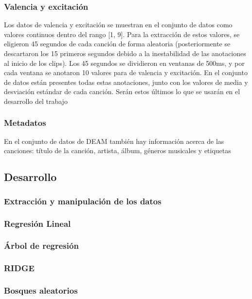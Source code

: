 \documentclass[12pt,a4paper,Spanish]{article}
\begin{document}
\subsubsection{Valencia y excitación}
Los datos de valencia y excitación se muestran en el conjunto de datos como valores continuos dentro del rango [1, 9].
\newline
Para la extracción de estos valores, se eligieron 45 segundos de cada canción de forma aleatoria (posteriormente se descartaron los 15 primeros segundos debido a la inestabilidad de las anotaciones al inicio de los clips). Los 45 segundos se dividieron en ventanas de 500ms, y por cada ventana se anotaron 10 valores para de valencia y excitación.
\newline
En el conjunto de datos están presentes todas estas anotaciones, junto con los valores de media y desviación estándar de cada canción. Serán estos últimos lo que se usarán en el desarrollo del trabajo

\subsubsection{Metadatos}
En el conjunto de datos de DEAM \cite{AlajankiEmoInMusicAnalysis} también hay información acerca de las canciones: título de la canción, artista, álbum, géneros musicales y etiquetas

\subsection{Desarrollo}
\subsubsection{Extracción y manipulación de los datos}





\subsubsection{Regresión Lineal}
\subsubsection{Árbol de regresión}
\subsubsection{RIDGE}
\subsubsection{Bosques aleatorios}
\end{document}
